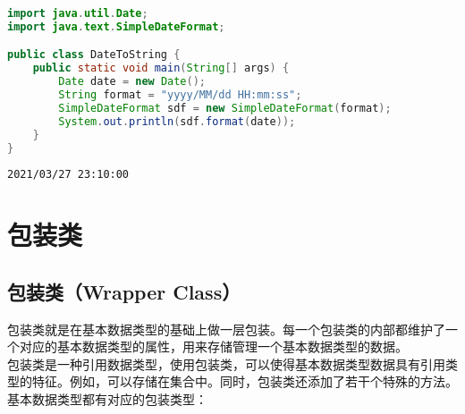 
\begin{lstlisting}[language=Java]
import java.util.Date;
import java.text.SimpleDateFormat;

public class DateToString {
    public static void main(String[] args) {
        Date date = new Date();
        String format = "yyyy/MM/dd HH:mm:ss";
        SimpleDateFormat sdf = new SimpleDateFormat(format);
        System.out.println(sdf.format(date));
    }
}
\end{lstlisting}

\begin{tcolorbox}
	\begin{verbatim}
2021/03/27 23:10:00
	\end{verbatim}
\end{tcolorbox}

\newpage

\section{包装类}

\subsection{包装类（Wrapper Class）}

包装类就是在基本数据类型的基础上做一层包装。每一个包装类的内部都维护了一个对应的基本数据类型的属性，用来存储管理一个基本数据类型的数据。 \\

包装类是一种引用数据类型，使用包装类，可以使得基本数据类型数据具有引用类型的特征。例如，可以存储在集合中。同时，包装类还添加了若干个特殊的方法。 \\

基本数据类型都有对应的包装类型：

\begin{table}[H]
	\centering
	\caption{包装类}
\end{table}

